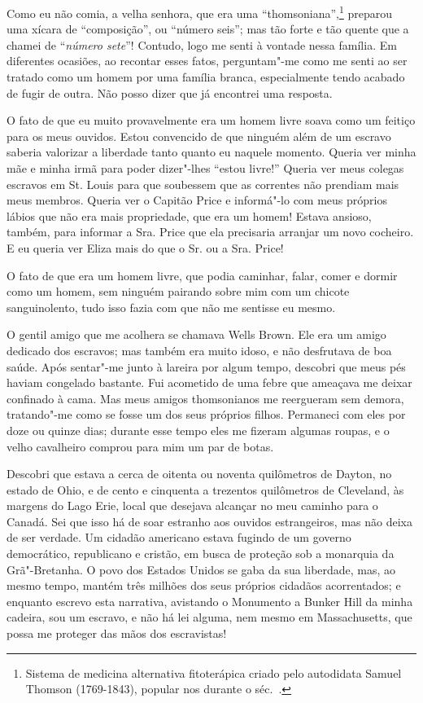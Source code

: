 Como eu não comia, a velha senhora, que era uma
``thomsoniana'',\footnote{Sistema de medicina alternativa fitoterápica
  criado pelo autodidata Samuel Thomson (1769-1843), popular nos 
  durante o séc.~.} preparou uma xícara de ``composição'', ou
``número seis''; mas tão forte e tão quente que a chamei de
``\emph{número sete}''! Contudo, logo me senti à vontade nessa família.
Em diferentes ocasiões, ao recontar esses fatos, perguntam"-me como me
senti ao ser tratado como um homem por uma família branca, especialmente
tendo acabado de fugir de outra. Não posso dizer que já encontrei uma
resposta.

O fato de que eu muito provavelmente era um homem livre soava como um
feitiço para os meus ouvidos. Estou convencido de que ninguém além de um
escravo saberia valorizar a liberdade tanto quanto eu naquele momento.
Queria ver minha mãe e minha irmã para poder dizer"-lhes ``estou livre!''
Queria ver meus colegas escravos em St. Louis para que soubessem que as
correntes não prendiam mais meus membros. Queria ver o Capitão Price e
informá"-lo com meus próprios lábios que não era mais propriedade, que
era um homem! Estava ansioso, também, para informar a Sra. Price que ela
precisaria arranjar um novo cocheiro. E eu queria ver Eliza mais do que
o Sr. ou a Sra. Price!

O fato de que era um homem livre, que podia caminhar, falar, comer e
dormir como um homem, sem ninguém pairando sobre mim com um chicote
sanguinolento, tudo isso fazia com que não me sentisse eu mesmo.

O gentil amigo que me acolhera se chamava Wells Brown. Ele era um amigo
dedicado dos escravos; mas também era muito idoso, e não desfrutava de
boa saúde. Após sentar"-me junto à lareira por algum tempo, descobri que
meus pés haviam congelado bastante. Fui acometido de uma febre que
ameaçava me deixar confinado à cama. Mas meus amigos thomsonianos me
reergueram sem demora, tratando"-me como se fosse um dos seus próprios
filhos. Permaneci com eles por doze ou quinze dias; durante esse tempo
eles me fizeram algumas roupas, e o velho cavalheiro comprou para mim um
par de botas.

Descobri que estava a cerca de oitenta ou noventa quilômetros de Dayton,
no estado de Ohio, e de cento e cinquenta a trezentos quilômetros de
Cleveland, às margens do Lago Erie, local que desejava alcançar no meu
caminho para o Canadá. Sei que isso há de soar estranho aos ouvidos
estrangeiros, mas não deixa de ser verdade. Um cidadão americano estava
fugindo de um governo democrático, republicano e cristão, em busca de
proteção sob a monarquia da Grã"-Bretanha. O povo dos Estados Unidos se
gaba da sua liberdade, mas, ao mesmo tempo, mantém três milhões dos seus
próprios cidadãos acorrentados; e enquanto escrevo esta narrativa,
avistando o Monumento a Bunker Hill da minha cadeira, sou um escravo, e
não há lei alguma, nem mesmo em Massachusetts, que possa me proteger das
mãos dos escravistas!

